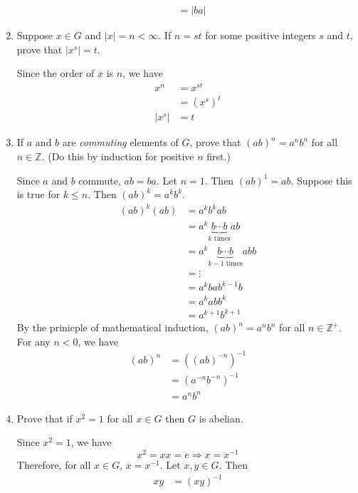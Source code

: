 \begin{enumerate}
\begin{align*}
                    & = \lvert ba\rvert
  \end{align*}
\item
  Suppose \(x\in G\) and \(\lvert x\rvert = n < \infty\).
  If \(n = st\) for some positive integers \(s\) and \(t\), prove that
  \(\lvert x^s\rvert = t\).
  \par\smallskip
  Since the order of \(x\) is \(n\), we have
  \begin{align*}
    x^n & = x^{st}\\
        & = (x^s)^t\\
    \lvert x^s\rvert & = t\tag{since \(x^n = (x^s)^t = e\)}
  \end{align*}
\item
  If \(a\) and \(b\) are \textit{commuting} elements of \(G\), prove that
  \((ab)^n = a^nb^n\) for all \(n\in\mathbb{Z}\).
  (Do this by induction for positive \(n\) first.)
  \par\smallskip
  Since \(a\) and \(b\) commute, \(ab = ba\).
  Let \(n = 1\).
  Then \((ab)^1 = ab\).
  Suppose this is true for \(k\leq n\).
  Then \((ab)^k = a^kb^k\).
  \begin{align*}
    (ab)^k(ab) & = a^kb^kab\\
               & = a^k\underbrace{b\cdots b}_{k\text{ times}}ab\\
               & = a^k\underbrace{b\cdots b}_{k - 1\text{ times}}abb\\
               & = \vdots\\
               & = a^kbab^{k - 1}b\\
               & = a^kabb^k\\
               & = a^{k + 1}b^{k + 1}
  \end{align*}
  By the prinicple of mathematical induction, \((ab)^n = a^nb^n\) for all
  \(n\in\mathbb{Z}^+\).
  For any \(n < 0\), we have
  \begin{align*}
    (ab)^n & = ((ab)^{-n})^{-1}\\
           & = (a^{-n}b^{-n})^{-1}\\
           & = a^nb^n
  \end{align*}
\item
  Prove that if \(x^2 = 1\) for all \(x\in G\) then \(G\) is abelian.
  \par\smallskip
  Since \(x^2 = 1\), we have
  \[
  x^2 = xx = e\Rightarrow x = x^{-1}
  \]
  Therefore, for all \(x\in G\), \(x = x^{-1}\).
  Let \(x,y\in G\).
  Then
  \begin{align*}
    xy & = (xy)^{-1}\\

\end{align*}
\end{enumerate}
